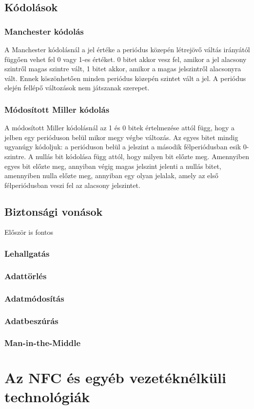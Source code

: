 \documentclass[12pt]{article}
\begin{document}
\subsection{Kódolások}

\subsubsection{Manchester kódolás}
A Manchester kódolásnál a jel értéke a periódus közepén létrejövő váltás irányától
függően vehet fel 0 vagy 1-es értéket. 0 bitet akkor vesz fel, amikor a jel
alacsony szintről magas szintre vált, 1 bitet akkor, amikor a magas jelszintről
alacsonyra vált. Ennek köszönhetően minden periódus közepén szintet vált a jel.
A periódus elején fellépő változások nem játszanak szerepet.

\subsubsection{Módosított Miller kódolás}
A módosított Miller kódolásnál az 1 és 0 bitek értelmezése attól függ, hogy
a jelben egy perióduson belül mikor megy végbe változás. Az egyes bitet
mindig ugyanúgy kódoljuk: a perióduson belül a jelszint a második félperiódusban
esik 0-szintre. A nullás bit kódolása függ attól, hogy milyen bit előzte meg.
Amennyiben egyes bit előzte meg, annyiban végig magas jelszint jelenti a nullás
bitet, amennyiben nulla előzte meg, annyiban egy olyan jelalak, amely az első
félperiódusban veszi fel az alacsony jelszintet.

\subsection{Biztonsági vonások}
Először is fontos 

\subsubsection{Lehallgatás}

\subsubsection{Adattörlés}

\subsubsection{Adatmódosítás}

\subsubsection{Adatbeszúrás}

\subsubsection{Man-in-the-Middle}

\section{Az NFC és egyéb vezetéknélküli technológiák}
\end{document}
